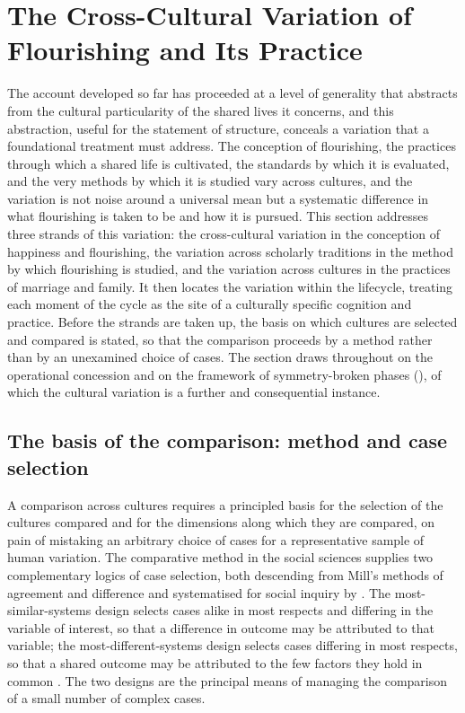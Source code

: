 \section{The Cross-Cultural Variation of Flourishing and Its Practice}
\label{p11:sec:crosscultural}

\noindent
The account developed so far has proceeded at a level of generality that abstracts from the cultural particularity of the shared lives it concerns, and this abstraction, useful for the statement of structure, conceals a variation that a foundational treatment must address. The conception of flourishing, the practices through which a shared life is cultivated, the standards by which it is evaluated, and the very methods by which it is studied vary across cultures, and the variation is not noise around a universal mean but a systematic difference in what flourishing is taken to be and how it is pursued. This section addresses three strands of this variation: the cross-cultural variation in the conception of happiness and flourishing, the variation across scholarly traditions in the method by which flourishing is studied, and the variation across cultures in the practices of marriage and family. It then locates the variation within the lifecycle, treating each moment of the cycle as the site of a culturally specific cognition and practice. Before the strands are taken up, the basis on which cultures are selected and compared is stated, so that the comparison proceeds by a method rather than by an unexamined choice of cases. The section draws throughout on the operational concession and on the framework of symmetry-broken phases (), of which the cultural variation is a further and consequential instance.

\subsection{The basis of the comparison: method and case selection}
\label{p11:sec:cc-method-basis}

A comparison across cultures requires a principled basis for the selection of the cultures compared and for the dimensions along which they are compared, on pain of mistaking an arbitrary choice of cases for a representative sample of human variation. The comparative method in the social sciences supplies two complementary logics of case selection, both descending from Mill's methods of agreement and difference \parencite{mill1843} and systematised for social inquiry by \textcite{przeworski1970}. The most-similar-systems design selects cases alike in most respects and differing in the variable of interest, so that a difference in outcome may be attributed to that variable; the most-different-systems design selects cases differing in most respects, so that a shared outcome may be attributed to the few factors they hold in common \parencite{lijphart1971}. The two designs are the principal means of managing the comparison of a small number of complex cases.

